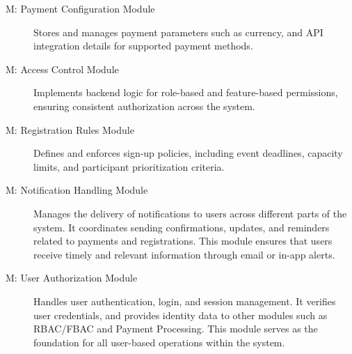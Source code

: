 \documentclass[12pt, titlepage]{article}
\newcounter{mnum}
\begin{document}
\begin{description}
\label{M4}
\item [M\themnum: Payment Configuration Module] Stores and manages payment parameters such
as currency, and API integration details for supported payment
methods.

\label{M5}
\item [M\themnum: Access Control Module] Implements backend logic for role-based and
feature-based permissions, ensuring consistent authorization across the system.

\label{M6}
\item [M\themnum: Registration Rules Module] Defines and enforces sign-up policies,
including event deadlines, capacity limits, and participant prioritization
criteria.

\label{M7}
\item [M\themnum: Notification Handling Module] Manages the delivery of notifications to
users across different parts of the system. It coordinates sending confirmations,
updates, and reminders related to payments and registrations. This module ensures
that users receive timely and relevant information through email or in-app alerts.

\label{M8}
\item [M\themnum: User Authorization Module] Handles user authentication, login, and
session management. It verifies user credentials, and
provides identity data to other modules such as RBAC/FBAC and Payment Processing.
This module serves as the foundation for all user-based operations within the system.
\end{description}
\end{document}
